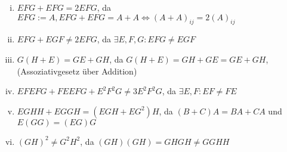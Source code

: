 \documentclass{article}
\begin{document}
    \begin{enumerate}[(i)]
        \item $EFG + EFG = 2EFG$, da $EFG:=A, EFG + EFG = A + A \Leftrightarrow (A+A)_{ij} = 2(A)_{ij}$
        \item $EFG + EGF \neq 2EFG$, da $\exists E, F, G: EFG \neq EGF$
        \item $G(H+E) = GE + GH$, da $G(H+E)=GH + GE = GE + GH$, (Assoziativgesetz über Addition)
        \item $ EF EF G + F EEF G + E^2F^2G \neq 3E^2F^2G$, da $\exists E, F: EF \neq FE$
        \item $EGHH+ EGGH = (EGH + EG^2)H$, da $(B + C)A = BA + CA$ und $E(GG) = (EG)G$
        \item $(GH)^2 \neq G^2H^2$, da $(GH)(GH) = GHGH \neq GGHH$
    \end{enumerate}
\end{document}
